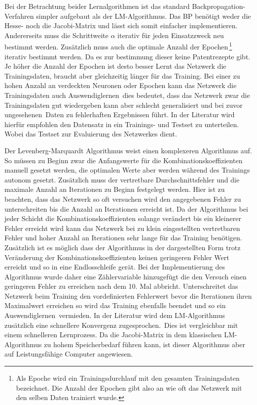 Bei der Betrachtung beider Lernalgorithmen ist das standard Backpropagation-Verfahren simpler aufgebaut als der LM-Algorithmus. Das BP benötigt weder die Hesse- noch die Jacobi-Matrix und lässt sich somit einfacher implementieren. Andererseits muss die Schrittweite $\alpha$ iterativ für jeden Einsatzzweck neu bestimmt werden. Zusätzlich muss auch die optimale Anzahl der Epochen\,\footnote{Als Epoche wird ein Trainingsdurchlauf mit den gesamten Trainingsdaten bezeichnet. Die Anzahl der Epochen gibt also an wie oft das Netzwerk mit den selben Daten trainiert wurde.%
} iterativ bestimmt werden. Da es zur bestimmung dieser keine Patentrezepte gibt. Je höher die Anzahl der Epochen ist desto besser Lernt das Netzwerk die Trainingsdaten, braucht aber gleichzeitig länger für das Training. Bei einer zu hohen Anzahl an verdeckten Neuronen oder Epochen kann das Netzwerk die Trainingsdaten auch \glqq Auswendiglernen\grqq~dies bedeutet, dass das Netzwerk zwar die Trainingsdaten gut wiedergeben kann aber schlecht generalisiert und bei zuvor \glqq ungesehenen\grqq~Daten zu fehlerhaften Ergebnissen führt. In der Literatur wird hierfür empfohlen den Datensatz in ein Trainings- und Testset zu unterteilen. Wobei das Testset zur Evaluierung des Netzwerkes dient.\,

Der Levenberg-Marquardt Algorithmus weist einen komplexeren Algorithmus auf. So müssen zu Beginn zwar die Anfangswerte für die Kombinationskoeffizienten manuell gesetzt werden, die optimalen Werte aber werden während des Trainings autonom gesetzt. Zusätzlich muss der vertretbare Durchschnittsfehler und die maximale Anzahl an Iterationen zu Beginn festgelegt werden. Hier ist zu beachten, dass das Netzwerk so oft versuchen wird den angegebenen Fehler zu unterschreiten bis die Anzahl an Iterationen erreicht ist. Da der Algorithmus bei jeder Schicht die Kombinationskoeffizienten solange verändert bis ein kleinerer Fehler erreicht wird kann das Netzwerk bei zu klein eingestellten vertretbaren Fehler und hoher Anzahl an Iterationen sehr lange für das Training benötigen. Zusätzlich ist es möglich dass der Algorithmus in der dargestellten Form trotz Veränderung der Kombinationskoeffizienten keinen geringeren Fehler Wert erreicht und so in eine Endlosschleife gerät. Bei der Implementierung des Algorithmus wurde daher eine Zählervariable hinzugefügt die den Versuch einen geringeren Fehler zu erreichen nach dem 10. Mal abbricht. Unterschreitet das Netzwerk beim Training den vordefinierten Fehlerwert bevor die Iterationen ihren Maximalwert erreichen so wird das Training ebenfalls beendet und so ein \glqq Auswendiglernen\grqq~vermieden. In der Literatur wird dem LM-Algorithmus zusätzlich eine schnellere Konvergenz zugesprochen.\, Dies ist vergleichbar mit einem schnelleren Lernprozess. Da die Jacobi-Matrix in dem klassischen LM-Algorithmus zu hohem Speicherbedarf führen kann, ist dieser Algorithmus aber auf Leistungsfähige Computer angewiesen. 


